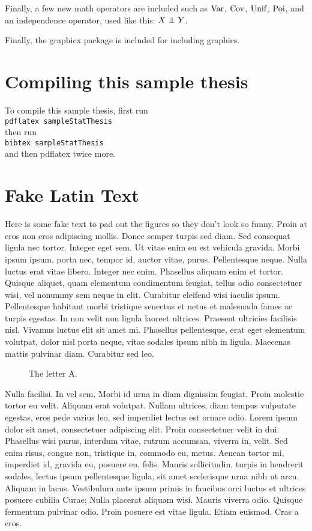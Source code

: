 \documentclass[oneside]{umnStatThesis}
\begin{document}
Finally, a few new math operators are included such as $\operatorname{Var}$, $\operatorname{Cov}$, $\operatorname{Unif}$, $\operatorname{Poi}$, and an independence operator, used like this: $X \indep Y$.

Finally, the graphicx package is included for including graphics.

\section{Compiling this sample thesis}
To compile this sample thesis, first run \\
\verb+pdflatex sampleStatThesis+\\
then run\\
\verb|bibtex sampleStatThesis|\\
and then pdflatex twice more.

\section{Fake Latin Text}
Here is some fake text to pad out the figures so they don't look so funny.  Proin at eros non eros adipiscing mollis. Donec semper turpis sed diam. Sed consequat ligula nec tortor. Integer eget sem. Ut vitae enim eu est vehicula gravida. Morbi ipsum ipsum, porta nec, tempor id, auctor vitae, purus. Pellentesque neque. Nulla luctus erat vitae libero. Integer nec enim. Phasellus aliquam enim et tortor. Quisque aliquet, quam elementum condimentum feugiat, tellus odio consectetuer wisi, vel nonummy sem neque in elit. Curabitur eleifend wisi iaculis ipsum. Pellentesque habitant morbi tristique senectus et netus et malesuada fames ac turpis egestas. In non velit non ligula laoreet ultrices. Praesent ultricies facilisis nisl. Vivamus luctus elit sit amet mi. Phasellus pellentesque, erat eget elementum volutpat, dolor nisl porta neque, vitae sodales ipsum nibh in ligula. Maecenas mattis pulvinar diam. Curabitur sed leo.

\begin{figure}
\caption{The letter A.}
\label{fig:a}
\end{figure}


Nulla facilisi. In vel sem. Morbi id urna in diam dignissim feugiat. Proin molestie tortor eu velit. Aliquam erat volutpat. Nullam ultrices, diam tempus vulputate egestas, eros pede varius leo, sed imperdiet lectus est ornare odio. Lorem ipsum dolor sit amet, consectetuer adipiscing elit. Proin consectetuer velit in dui. Phasellus wisi purus, interdum vitae, rutrum accumsan, viverra in, velit. Sed enim risus, congue non, tristique in, commodo eu, metus. Aenean tortor mi, imperdiet id, gravida eu, posuere eu, felis. Mauris sollicitudin, turpis in hendrerit sodales, lectus ipsum pellentesque ligula, sit amet scelerisque urna nibh ut arcu. Aliquam in lacus. Vestibulum ante ipsum primis in faucibus orci luctus et ultrices posuere cubilia Curae; Nulla placerat aliquam wisi. Mauris viverra odio. Quisque fermentum pulvinar odio. Proin posuere est vitae ligula. Etiam euismod. Cras a eros.
\end{document}

